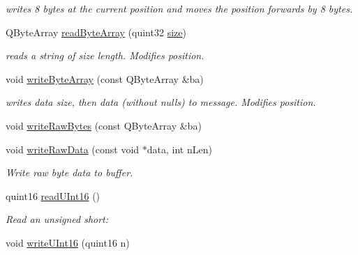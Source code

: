 \begin{DoxyCompactItemize}
\begin{DoxyCompactList}\small\item\em writes 8 bytes at the current position and moves the position forwards by 8 bytes. \end{DoxyCompactList}\item 
Q\+Byte\+Array \hyperlink{class_i_o_buffer_af54078c28c7295c9bb28740bf4990104}{read\+Byte\+Array} (quint32 \hyperlink{class_i_o_buffer_a42b956c3deeece1c211f4d907b81df4f}{size})\hypertarget{class_i_o_buffer_af54078c28c7295c9bb28740bf4990104}{}\label{class_i_o_buffer_af54078c28c7295c9bb28740bf4990104}

\begin{DoxyCompactList}\small\item\em reads a string of size length. Modifies position. \end{DoxyCompactList}\item 
void \hyperlink{class_i_o_buffer_abaafe1bdd43d424fca4b9bac5846cfaf}{write\+Byte\+Array} (const Q\+Byte\+Array \&ba)\hypertarget{class_i_o_buffer_abaafe1bdd43d424fca4b9bac5846cfaf}{}\label{class_i_o_buffer_abaafe1bdd43d424fca4b9bac5846cfaf}

\begin{DoxyCompactList}\small\item\em writes data size, then data (without nulls) to message. Modifies position. \end{DoxyCompactList}\item 
void \hyperlink{class_i_o_buffer_adce0cfc8dfc3d6ccc69513e10a178957}{write\+Raw\+Bytes} (const Q\+Byte\+Array \&ba)
\item 
void \hyperlink{class_i_o_buffer_af9619b26aafb45844f63a215124de76e}{write\+Raw\+Data} (const void $\ast$data, int n\+Len)\hypertarget{class_i_o_buffer_af9619b26aafb45844f63a215124de76e}{}\label{class_i_o_buffer_af9619b26aafb45844f63a215124de76e}

\begin{DoxyCompactList}\small\item\em Write raw byte data to buffer. \end{DoxyCompactList}\item 
quint16 \hyperlink{class_i_o_buffer_abba978ccb9022bc608216cc881621344}{read\+U\+Int16} ()\hypertarget{class_i_o_buffer_abba978ccb9022bc608216cc881621344}{}\label{class_i_o_buffer_abba978ccb9022bc608216cc881621344}

\begin{DoxyCompactList}\small\item\em Read an unsigned short\+: \end{DoxyCompactList}\item 
void \hyperlink{class_i_o_buffer_a6e2c7b30872f141e758f7ce0bcee0c87}{write\+U\+Int16} (quint16 n)\hypertarget{class_i_o_buffer_a6e2c7b30872f141e758f7ce0bcee0c87}{}\label{class_i_o_buffer_a6e2c7b30872f141e758f7ce0bcee0c87}


\end{DoxyCompactItemize}
